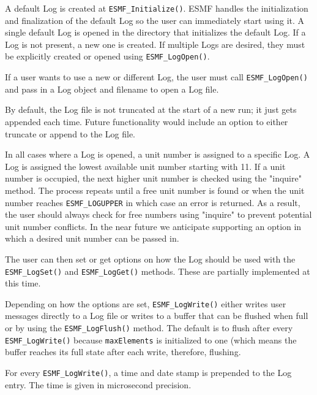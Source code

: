 

A default Log is created at {\tt ESMF\_Initialize()}.  ESMF handles 
the initialization and finalization of the default Log so the user 
can immediately start using it.  A single default Log is opened 
in the directory that initializes the default Log.  If a Log is 
not present, a new one is created.  If multiple Logs are 
desired, they must be explicitly created or opened using 
{\tt ESMF\_LogOpen()}.

If a user wants to use a new or different Log, the user must call
{\tt ESMF\_LogOpen()} and pass in a Log object and filename to open a Log 
file.
 
By default, the Log file is not truncated at the start of a new run; it just
gets appended each time.  Future functionality would include an option to
either truncate or append to the Log file. 

In all cases where a Log is opened, a unit number is assigned to a specific
Log.  A Log is assigned the lowest available unit number starting with
11.  If a unit number is occupied, the next higher unit number is 
checked using the "inquire" method.  The process repeats until a free unit 
number is found or when the unit number reaches {\tt ESMF\_LOGUPPER} in 
which case an error is returned.  As a result, the user should always check
for free numbers using "inquire" to prevent potential unit number conflicts.
In the near future we anticipate supporting an option in which a desired
unit number can be passed in.

The user can then set or get options on how the Log should be used 
with the {\tt ESMF\_LogSet()} and {\tt ESMF\_LogGet()} methods.  These are 
partially implemented at this time. 

Depending on how the options are set, {\tt ESMF\_LogWrite()} either writes user
messages directly to a Log file or writes to a buffer that can be flushed when 
full or by using the {\tt ESMF\_LogFlush()} method.  The default is to flush 
after every {\tt ESMF\_LogWrite()} because {\tt maxElements} is initialized to
one (which means the buffer reaches its full state after each write, therefore,
flushing.

For every {\tt ESMF\_LogWrite()}, a time and date stamp is prepended to the
Log entry.  The time is given in microsecond precision.


